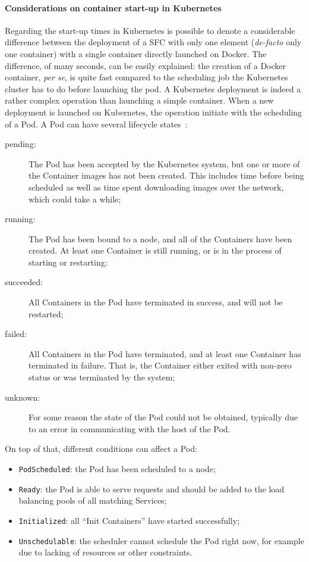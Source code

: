 \paragraph*{Considerations on container start-up in Kubernetes}
Regarding the start-up times in Kubernetes is possible to denote a considerable
difference between the deployment of a SFC with only one element
(\textit{de-facto} only one container) with a single container directly launched
on Docker. The difference, of many seconds, can be easily explained: the
creation of a Docker container, \textit{per se}, is quite fast compared to the
scheduling job the Kubernetes cluster has to do before launching the pod. A
Kubernetes deployment is indeed a rather complex operation than launching a
simple container. When a new deployment is launched on Kubernetes, the operation
initiate with the scheduling of a Pod. A Pod can have several lifecycle
states~\cite{kubePodLifecycle}:
\begin{description}
\item[pending:] The Pod has been accepted by the Kubernetes system, but one or
  more of the Container images has not been created. This includes time before
  being scheduled as well as time spent downloading images over the network,
  which could take a while;
\item[running:] The Pod has been bound to a node, and all of the Containers have
  been created. At least one Container is still running, or is in the process of
  starting or restarting;
\item[succeeded:] All Containers in the Pod have terminated in success, and will
  not be restarted;
\item[failed:] All Containers in the Pod have terminated, and at least one
  Container has terminated in failure. That is, the Container either exited with
  non-zero status or was terminated by the system;
\item[unknown:] For some reason the state of the Pod could not be obtained,
  typically due to an error in communicating with the host of the Pod.
\end{description}

On top of that, different conditions can affect a Pod:
\begin{itemize}
\item \verb!PodScheduled!: the Pod has been scheduled to a node;
\item \verb!Ready!: the Pod is able to serve requests and should be added to the
  load balancing pools of all matching Services;
\item \verb!Initialized!: all ``Init Containers'' have started successfully;
\item \verb!Unschedulable!: the scheduler cannot schedule the Pod right now, for
  example due to lacking of resources or other constraints.
\end{itemize}

